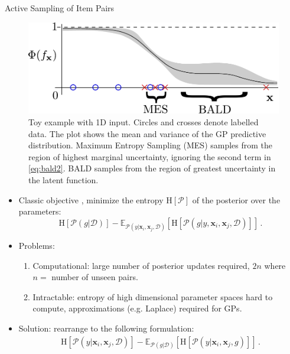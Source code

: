 \documentclass[final]{beamer}
\newlength{\onecolwid}
\newcommand{\data}{\mathcal{D}}
\newcommand{\ent}{\mathrm{H}}
\newcommand{\E}{\mathbb{E}}
\begin{document}
\begin{frame}[t]
\begin{columns}[t]
\begin{column}{\onecolwid}
      \begin{block}{Active Sampling of Item Pairs}
      \begin{figure}
        \includegraphics[scale = 1.0]{figs/BALD_eg.pdf}
        \caption{Toy example with 1D input. Circles and crosses
        denote labelled data. The plot shows the mean and variance of the GP predictive
        distribution. Maximum Entropy Sampling (MES)
        samples from the region of highest marginal uncertainty, ignoring the
        second term in \eqref{eq:bald2}. BALD samples
        from the region of greatest uncertainty in the latent function.\label{fig:bald}}
      \end{figure}
      \begin{itemize}
        \item Classic objective \cite{lindley1956}, minimize the entropy $\ent[\mathcal{P}]$
        of the posterior over the parameters:
        \begin{equation}
          \ent[\mathcal{P}(g|\mathcal{D})] - \E_{\mathcal{P}(y|\mathbf{x}_i,\mathbf{x}_j,\data)}
          \left[ \ent[\mathcal{P}(g|y,\mathbf{x}_i,\mathbf{x}_j,\data)]\right]\,. \label{eq:bald1}
        \end{equation}
        \item Problems:
        \begin{enumerate}
          \item Computational: large number of posterior updates required, $2n$ where $n=$ number of unseen pairs.
          \item Intractable: entropy of high dimensional parameter spaces hard to compute,
          approximations (e.g. Laplace) required for GPs.
        \end{enumerate}
        \item Solution: rearrange to the following formulation:
          \begin{align}
            \ent[\mathcal{P}(y|\mathbf{x}_i,\mathbf{x}_j,\data)] - \E_{\mathcal{P}(g|\data)}
            \left[\ent\left[ \mathcal{P}(y|\mathbf{x}_i,\mathbf{x}_j,g)\right]\right]\,.

\end{align}
\end{itemize}
\end{block}
\end{column}
\end{columns}
\end{frame}
\end{document}
